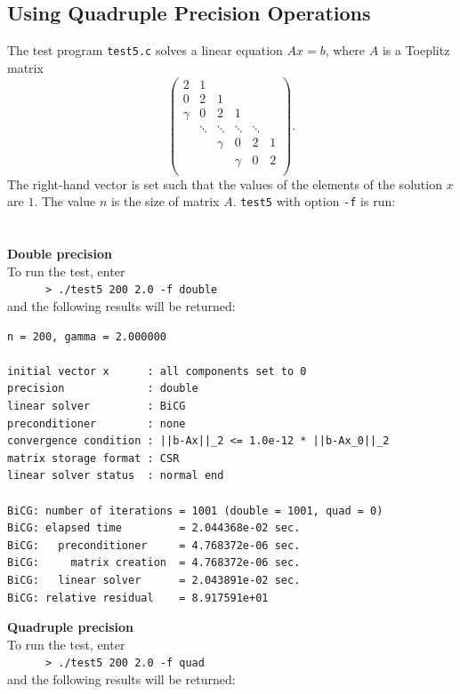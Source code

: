 \documentclass[a4paper]{article}
\begin{document}
\subsection{Using Quadruple Precision Operations}
\label{sec:testprog5}
The test program \verb|test5.c| solves a linear equation $Ax =b$, where $A$ is a Toeplitz matrix
\[
\left(
\begin{array}{cccccc}
2 & 1 &   &  &  & \\
0 & 2 & 1 &  &  & \\
\gamma & 0& 2 & 1 &  & \\
 & \ddots & \ddots & \ddots & \ddots & \\
 &  &   \gamma &0 &       2   & 1 \\
 &  &  &   \gamma & 0& 2 \\
\end{array}
\right).
\]
The right-hand vector is set such that the values of the elements 
of the solution $x$ are $1$. The value $n$ is the size of matrix $A$.
\verb|test5| with option {\tt -f} is run: \\
\\ \\
\noindent
{\bf Double precision}\\
To run the test, enter\\
\verb+      > ./test5 200 2.0 -f double+\\
and the following results will be returned:

\begin{verbatim}
n = 200, gamma = 2.000000

initial vector x      : all components set to 0
precision             : double
linear solver         : BiCG
preconditioner        : none
convergence condition : ||b-Ax||_2 <= 1.0e-12 * ||b-Ax_0||_2
matrix storage format : CSR
linear solver status  : normal end

BiCG: number of iterations = 1001 (double = 1001, quad = 0)
BiCG: elapsed time         = 2.044368e-02 sec.
BiCG:   preconditioner     = 4.768372e-06 sec. 
BiCG:     matrix creation  = 4.768372e-06 sec.
BiCG:   linear solver      = 2.043891e-02 sec.
BiCG: relative residual    = 8.917591e+01
\end{verbatim}

\noindent
{\bf Quadruple precision}\\
To run the test, enter\\
\verb+      > ./test5 200 2.0 -f quad+\\
and the following results will be returned:
\end{document}
